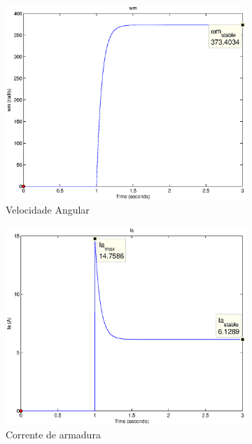 \documentclass{article}
\begin{document}
\begin{figure}[H]
	\centering
	\begin{subfigure}[b]{0.49\linewidth}
		\includegraphics[width=\linewidth]{matlab/wm2}
		\caption{Velocidade Angular}
	\end{subfigure}
	\begin{subfigure}[b]{0.49\linewidth}
		\centering
		\includegraphics[width=\linewidth]{matlab/ia2}
		\caption{Corrente de armadura}
	\end{subfigure}
	\begin{subfigure}[b]{0.49\linewidth}

\end{subfigure}
\end{figure}
\end{document}
